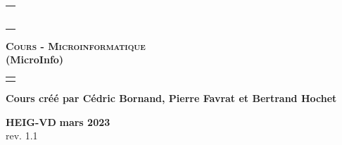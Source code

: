 \documentclass[10pt,a4paper]{book}
\newcommand{\version}{1.1}
\begin{document}

\begin{titlepage}
\begin{tabular}{l}
 \\
 \\
 \\
 \\
 \\
 \\
 \\

\end{tabular}
\begin{center}
\Large\textbf{\textsc{Cours -  Microinformatique} }\\

\Large\textbf{ (MicroInfo)}
\end{center}
\begin{tabular}{c}
 \\
 \\
\end{tabular}
\begin{center}
  \textbf{Cours créé par Cédric Bornand, Pierre Favrat et Bertrand Hochet}
\end{center}
\begin{center}
\textbf{HEIG-VD}
\textbf{mars 2023} \\
 rev. \version
\end{center}
\begin{tabular}{c}
 \\ 
\end{tabular}

 \end{titlepage}
\end{document}
